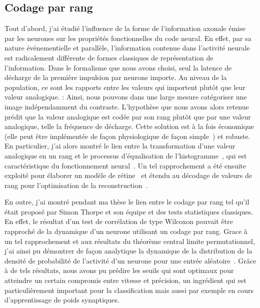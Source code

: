 \documentclass[11pt,french,a4paper,oneside]{article}%
\begin{document}
\subsection{Codage par rang}
Tout d'abord, j'ai étudié l'influence de la forme de l'information axonale émise par les neurones sur les propriétés fonctionnelles du code neural. En effet, par sa nature événementielle et parallèle, l'information contenue dans l'activité neurale est radicalement différente de formes classiques de représentation de l'information. Dans le formalisme que nous avons choisi, seul la latence de décharge de la première impulsion par neurone importe. Au niveau de la population, ce sont les rapports entre les valeurs qui importent plutôt que leur valeur analogique. %
: Ainsi, nous pouvons dans une large mesure catégoriser une image indépendamment du contraste. 
L'hypothèse que nous avons alors retenue prédit que la valeur analogique est codée par son rang plutôt que par une valeur analogique, telle la fréquence de décharge. Cette solution est à la fois économique (elle peut être implémentée de façon physiologique de façon simple~\citep{Delorme01}) et robuste. En particulier, j'ai alors montré le lien entre la transformation d'une valeur analogique en un rang et le processus d'équalisation de l'histogramme~\citep{Perrinet99}, qui est caractéristique du fonctionnement neural~\citep{Laughlin81}. Un tel rapprochement a été ensuite exploité pour élaborer un modèle de rétine~\citep{van-Rullen01a} et étendu au décodage de valeurs de rang pour l'optimisation de la reconstruction~\citep{Perrinet04a,Perrinet10shl}. %

En outre, j'ai montré pendant ma thèse le lien entre le codage par rang tel qu'il était proposé par Simon Thorpe et son équipe et des tests statistiques classiques. En effet, le résultat d'un test de corrélation de type Wilcoxon pouvait être rapproché de la dynamique d'un neurone utilisant un codage par rang. Grace à un tel rapprochement et aux résultats du théorème central limite permutationnel, j'ai ainsi pu démontrer de façon analytique la dynamique de la distribution de la densité de probabilité de l'activité d'un neurone pour une entrée aléatoire~\citep{Perrinet03these}. Grâce à de tels résultats, nous avons pu prédire les seuils qui sont optimaux pour atteindre un certain compromis entre vitesse et précision, un ingrédient qui est particulièrement important pour la classification mais aussi par exemple en cours d'apprentissage de poids synaptiques. %
%
\end{document}
